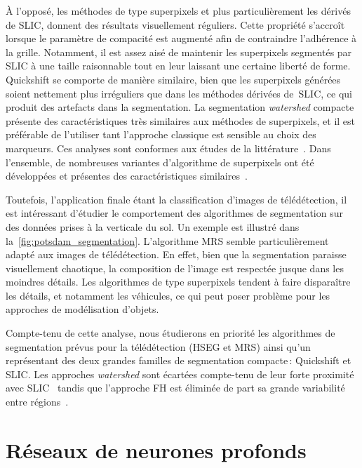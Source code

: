 À l'opposé, les méthodes de type superpixels et plus particulièrement les dérivés de \gls{SLIC}, donnent des résultats visuellement réguliers. Cette propriété s'accroît lorsque le paramètre de compacité est augmenté afin de contraindre l'adhérence à la grille. Notamment, il est assez aisé de maintenir les superpixels segmentés par \gls{SLIC} à une taille raisonnable tout en leur laissant une certaine liberté de forme. Quickshift se comporte de manière similaire, bien que les superpixels générées soient nettement plus irréguliers que dans les méthodes dérivées de~\gls{SLIC}, ce qui produit des artefacts dans la segmentation. La segmentation \emph{watershed} compacte présente des caractéristiques très similaires aux méthodes de superpixels, et il est préférable de l'utiliser tant l'approche classique est sensible au choix des marqueurs. Ces analyses sont conformes aux études de la littérature~\cite{neubert_superpixel_2012,achanta_slic_2012}. Dans l'ensemble, de nombreuses variantes d'algorithme de superpixels ont été développées et présentes des caractéristiques similaires~\cite{stutz_superpixels_2018}.

Toutefois, l'application finale étant la classification d'images de télédétection, il est intéressant d'étudier le comportement des algorithmes de segmentation sur des données prises à la verticale du sol. Un exemple est illustré dans la~\cref{fig:potsdam_segmentation}. L'algorithme \gls{MRS} semble particulièrement adapté aux images de télédétection. En effet, bien que la segmentation paraisse visuellement chaotique, la composition de l'image est respectée jusque dans les moindres détails. Les algorithmes de type superpixels tendent à faire disparaître les détails, et notamment les véhicules, ce qui peut poser problème pour les approches de modélisation d'objets.

Compte-tenu de cette analyse, nous étudierons en priorité les algorithmes de segmentation prévus pour la télédétection (\gls{HSEG} et \gls{MRS}) ainsi qu'un représentant des deux grandes familles de segmentation compacte\,: Quickshift et \gls{SLIC}. Les approches \emph{watershed} sont écartées compte-tenu de leur forte proximité avec \gls{SLIC}~\cite{neubert_compact_2014} tandis que l'approche \gls{FH} est éliminée de part sa grande variabilité entre régions~\cite{neubert_superpixel_2012}.

\section{Réseaux de neurones profonds}

